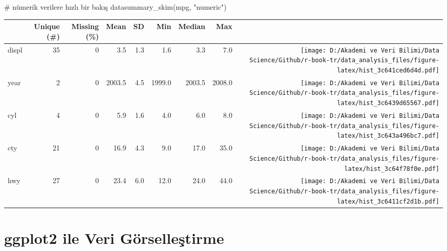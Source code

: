 \documentclass[
  letterpaper,
  DIV=11,
  numbers=noendperiod]{scrreprt}
\newenvironment{Shaded}{\begin{snugshade}}{\end{snugshade}}
\newcommand{\CommentTok}[1]{\textcolor[rgb]{0.37,0.37,0.37}{#1}}
\newcommand{\FunctionTok}[1]{\textcolor[rgb]{0.28,0.35,0.67}{#1}}
\newcommand{\NormalTok}[1]{\textcolor[rgb]{0.00,0.23,0.31}{#1}}
\newcommand{\StringTok}[1]{\textcolor[rgb]{0.13,0.47,0.30}{#1}}
\begin{document}
\begin{Shaded}
\begin{Highlighting}[]
\CommentTok{\# nümerik verilere hızlı bir bakış}
\FunctionTok{datasummary\_skim}\NormalTok{(mpg, }\StringTok{"numeric"}\NormalTok{)}
\end{Highlighting}
\end{Shaded}

\begin{table}
\centering
\begin{tabular}[t]{lrrrrrrr>{}r}
\toprule
  & Unique (\#) & Missing (\%) & Mean & SD & Min & Median & Max &   \\
\midrule
displ & 35 & 0 & \num{3.5} & \num{1.3} & \num{1.6} & \num{3.3} & \num{7.0} & \texttt{[image: D:/Akademi ve Veri Bilimi/Data Science/Github/r-book-tr/data\_analysis\_files/figure-latex/hist\_3c641ced6d4d.pdf]}\\
year & 2 & 0 & \num{2003.5} & \num{4.5} & \num{1999.0} & \num{2003.5} & \num{2008.0} & \texttt{[image: D:/Akademi ve Veri Bilimi/Data Science/Github/r-book-tr/data\_analysis\_files/figure-latex/hist\_3c6439d65567.pdf]}\\
cyl & 4 & 0 & \num{5.9} & \num{1.6} & \num{4.0} & \num{6.0} & \num{8.0} & \texttt{[image: D:/Akademi ve Veri Bilimi/Data Science/Github/r-book-tr/data\_analysis\_files/figure-latex/hist\_3c643a496bc7.pdf]}\\
cty & 21 & 0 & \num{16.9} & \num{4.3} & \num{9.0} & \num{17.0} & \num{35.0} & \texttt{[image: D:/Akademi ve Veri Bilimi/Data Science/Github/r-book-tr/data\_analysis\_files/figure-latex/hist\_3c64f78f0e.pdf]}\\
hwy & 27 & 0 & \num{23.4} & \num{6.0} & \num{12.0} & \num{24.0} & \num{44.0} & \texttt{[image: D:/Akademi ve Veri Bilimi/Data Science/Github/r-book-tr/data\_analysis\_files/figure-latex/hist\_3c6411cf2d1b.pdf]}\\
\bottomrule
\end{tabular}
\end{table}


\hypertarget{ggplot2-ile-veri-guxf6rselleux15ftirme}{%
\chapter*{ggplot2 ile Veri
Görselleştirme}\label{ggplot2-ile-veri-guxf6rselleux15ftirme}}

\end{document}
